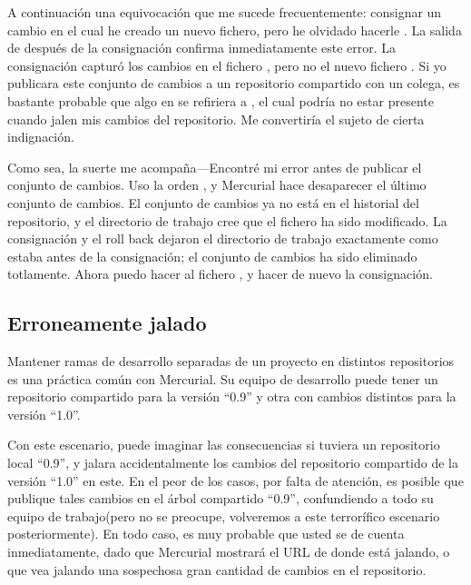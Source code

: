 A continuación una equivocación que me sucede frecuentemente:
consignar un cambio en el cual he creado un nuevo fichero, pero he
olvidado hacerle .
La salida de  después de la consignación confirma
inmediatamente este error.
La consignación capturó los cambios en el fichero , pero
no el nuevo fichero .  Si yo publicara este conjunto de
cambios a un repositorio compartido con un colega, es bastante
probable que algo en  se refiriera a , el cual
podría no estar presente cuando jalen mis cambios del repositorio.  Me
convertiría el sujeto de cierta indignación.

Como sea, la suerte me acompaña---Encontré mi error antes de publicar
el conjunto de cambios.  Uso la orden , y Mercurial
hace desaparecer el último conjunto de cambios.
El conjunto de cambios ya no está en el historial del repositorio, y el
directorio de trabajo cree que el fichero  ha sido
modificado.  La consignación y el roll back dejaron el directorio de
trabajo exactamente como estaba antes de la consignación; el conjunto
de cambios ha sido eliminado totlamente. Ahora puedo hacer 
al fichero , y hacer de nuevo la consignación.

\subsection{Erroneamente jalado}

Mantener ramas de desarrollo separadas de un proyecto en distintos
repositorios es una práctica común con Mercurial.  Su equipo de
desarrollo puede tener un repositorio compartido para la versión ``0.9''
y otra con cambios distintos para la versión ``1.0''.

Con este escenario, puede imaginar las consecuencias si tuviera un
repositorio local ``0.9'', y jalara accidentalmente los cambios del
repositorio compartido de la versión ``1.0'' en este.  En el peor de
los casos, por falta de atención, es posible que publique tales
cambios en el árbol compartido ``0.9'', confundiendo a todo su equipo
de trabajo(pero no se preocupe, volveremos a este terrorífico
escenario posteriormente).  En todo caso, es muy probable que usted se
de cuenta inmediatamente, dado que Mercurial mostrará el URL de donde
está jalando, o que vea jalando una sospechosa gran cantidad de
cambios en el repositorio.

